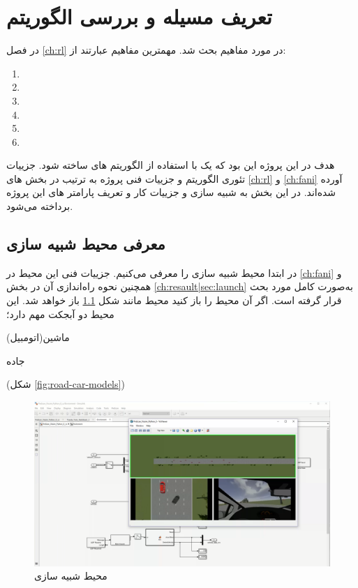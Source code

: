 \chapter{تعریف مسیله و بررسی الگوریتم}\label{ch:alg}

در فصل \ref{ch:rl} در مورد مفاهیم  بحث شد. مهمترین مفاهیم عبارتند از:
\begin{multicols}{3}
\begin{enumerate}
	\item {} \item {} \item {} \item {} \item {} \item {} 
\end{enumerate}
\end{multicols}

هدف در این پروژه این بود که یک  با استفاده از الگوریتم های  ساخته شود. جزییات تئوری الگوریتم و جزییات فنی پروژه به ترتیب در بخش های 
\ref{ch:rl}
و
\ref{ch:fani}
آورده شده‌اند.
در این بخش به شبیه سازی و جزییات کار و تعریف پارامتر های این پروژه برداخته می‌شود.

\section{معرفی محیط شبیه سازی}

در ابتدا محیط شبیه سازی را معرفی می‌کنیم. جزییات فنی این محیط در \ref{ch:fani} و همچنین نحوه راه‌اندازی آن در بخش \ref{ch:resault|sec:launch} به‌صورت کامل مورد بحث قرار گرفته است. اگر آن محیط را باز کنید محیط مانند شکل 
\ref{fig:obs-1}
باز خواهد شد. این محیط دو آبجکت مهم دارد؛
\begin{alphinline}
	\item ماشین(اتومبیل)
	\item جاده
\end{alphinline}
(شکل \ref{fig:road-car-models}) 



\begin{figure}
	\centering
	\includegraphics[width=0.7\linewidth]{Figures/OBS/1}
	\caption{محیط شبیه سازی}
	\label{fig:obs-1}
\end{figure}


